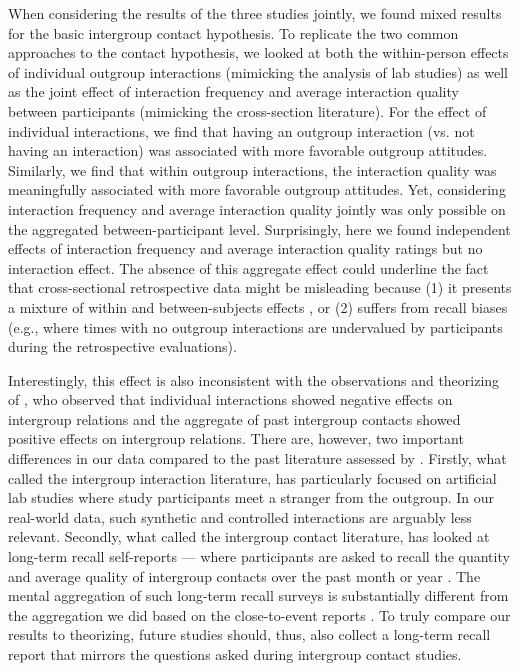 \documentclass[man, 12pt, a4paper, mask]{apa7}
\theoremstyle{break}
\theoremstyle{plain}
\begin{document}
When considering the results of the three studies jointly, we found mixed results for the basic intergroup contact hypothesis. To replicate the two common approaches to the contact hypothesis, we looked at both the within-person effects of individual outgroup interactions (mimicking the analysis of lab studies) as well as the joint effect of interaction frequency and average interaction quality between participants (mimicking the cross-section literature). For the effect of individual interactions, we find that having an outgroup interaction (vs. not having an interaction) was associated with more favorable outgroup attitudes. Similarly, we find that within outgroup interactions, the interaction quality was meaningfully associated with more favorable outgroup attitudes. Yet, considering interaction frequency and average interaction quality jointly was only possible on the aggregated between-participant level. Surprisingly, here we found independent effects of interaction frequency and average interaction quality ratings but no interaction effect. The absence of this aggregate effect could underline the fact that cross-sectional retrospective data might be misleading because (1) it presents a mixture of within and between-subjects effects \citep[][]{Hamaker2020}, or (2) suffers from recall biases (e.g., where times with no outgroup interactions are undervalued by participants during the retrospective evaluations). 

Interestingly, this effect is also inconsistent with the observations and theorizing of \citet[][]{MacInnis2015}, who observed that individual interactions showed negative effects on intergroup relations and the aggregate of past intergroup contacts showed positive effects on intergroup relations. There are, however, two important differences in our data compared to the past literature assessed by \citeauthor{MacInnis2015}. Firstly, what \citeauthor{MacInnis2015} called the intergroup interaction literature, has particularly focused on artificial lab studies where study participants meet a stranger from the outgroup. In our real-world data, such synthetic and controlled interactions are arguably less relevant. Secondly, what \citeauthor{MacInnis2015} called the intergroup contact literature, has looked at long-term recall self-reports --- where participants are asked to recall the quantity and average quality of intergroup contacts over the past month or year \citep{MacInnis2015}. The mental aggregation of such long-term recall surveys is substantially different from the aggregation we did based on the close-to-event reports \citep[][]{shiffman2008}. To truly compare our results to \citet[][]{MacInnis2015} theorizing, future studies should, thus, also collect a long-term recall report that mirrors the questions asked during intergroup contact studies.
\end{document}

